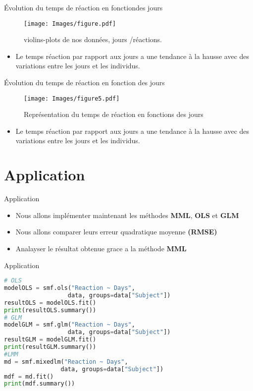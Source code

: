 \documentclass[unknownkeysallowed]{beamer}
\begin{document}
\begin{frame}{Évolution du temps de réaction en fonctiondes jours}
    \begin{figure}[H]
    \centering
    \texttt{[image: Images/figure.pdf]}
    \caption{violins-plots de nos données, jours /réactions.}
\end{figure}
    \begin{itemize}
     \item Le temps réaction par rapport aux jours a une tendance à la hausse avec des variations entre les jours et les individus.
    
 \end{itemize}
\end{frame}

\begin{frame}{Évolution du temps de réaction en fonction des jours}
    \begin{figure}[H]
    \centering
    \texttt{[image: Images/figure5.pdf]}
    \caption{Représentation du temps de réaction en fonctions des jours}
\end{figure}
\begin{itemize}
     \item Le temps réaction par rapport aux jours a une tendance à la hausse avec des variations entre les jours et les individus.
 \end{itemize}
\end{frame}

\section{Application}
\begin{frame}{Application}
   \begin{itemize}
       \item Nous allons implémenter maintenant les méthodes \textbf{MML}, \textbf{OLS} et \textbf{GLM}
       \item  Nous allons comparer leurs erreur quadratique moyenne \textbf{(RMSE)}
       \item Analayser le résultat obtenue grace a la méthode \textbf{MML}
   \end{itemize}
\end{frame}


\begin{frame}[fragile]{Application}

\begin{lstlisting}[language=Python]
# OLS
modelOLS = smf.ols("Reaction ~ Days", 
                  data, groups=data["Subject"])
resultOLS = modelOLS.fit()
print(resultOLS.summary())
# GLM
modelGLM = smf.glm("Reaction ~ Days", 
                  data, groups=data["Subject"])
resultGLM = modelGLM.fit()
print(resultGLM.summary())
#LMM
md = smf.mixedlm("Reaction ~ Days", 
                data, groups=data["Subject"])
mdf = md.fit()
print(mdf.summary())
\end{lstlisting}

\end{frame}
\end{document}
